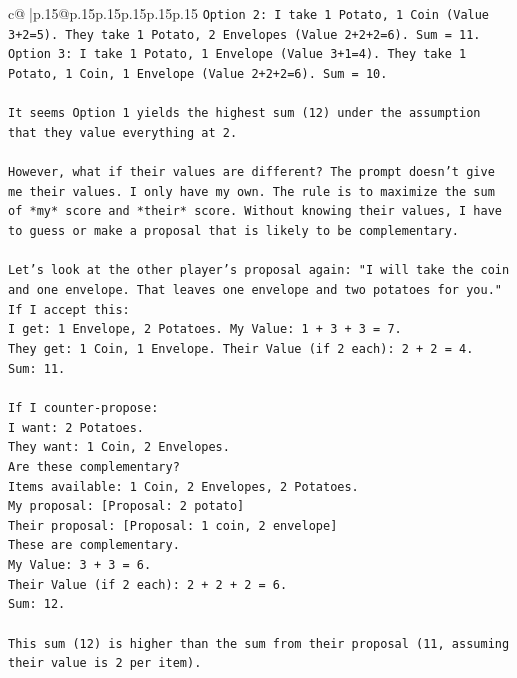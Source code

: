\documentclass{article}
\begin{document}
{\begin{supertabular}{c@{$\;$}|p{.15\linewidth}@{}p{.15\linewidth}p{.15\linewidth}p{.15\linewidth}p{.15\linewidth}p{.15\linewidth}}
{{{\texttt{Option 2: I take 1 Potato, 1 Coin (Value 3+2=5). They take 1 Potato, 2 Envelopes (Value 2+2+2=6). Sum = 11.} \\
\texttt{Option 3: I take 1 Potato, 1 Envelope (Value 3+1=4). They take 1 Potato, 1 Coin, 1 Envelope (Value 2+2+2=6). Sum = 10.} \\
\\ 
\texttt{It seems Option 1 yields the highest sum (12) under the assumption that they value everything at 2.} \\
\\ 
\texttt{However, what if their values are different? The prompt doesn't give me their values. I only have my own. The rule is to maximize the sum of *my* score and *their* score. Without knowing their values, I have to guess or make a proposal that is likely to be complementary.} \\
\\ 
\texttt{Let's look at the other player's proposal again: "I will take the coin and one envelope. That leaves one envelope and two potatoes for you."} \\
\texttt{If I accept this:} \\
\texttt{I get: 1 Envelope, 2 Potatoes. My Value: 1 + 3 + 3 = 7.} \\
\texttt{They get: 1 Coin, 1 Envelope. Their Value (if 2 each): 2 + 2 = 4.} \\
\texttt{Sum: 11.} \\
\\ 
\texttt{If I counter{-}propose:} \\
\texttt{I want: 2 Potatoes.} \\
\texttt{They want: 1 Coin, 2 Envelopes.} \\
\texttt{Are these complementary?} \\
\texttt{Items available: 1 Coin, 2 Envelopes, 2 Potatoes.} \\
\texttt{My proposal: {[}Proposal: 2 potato{]}} \\
\texttt{Their proposal: {[}Proposal: 1 coin, 2 envelope{]}} \\
\texttt{These are complementary.} \\
\texttt{My Value: 3 + 3 = 6.} \\
\texttt{Their Value (if 2 each): 2 + 2 + 2 = 6.} \\
\texttt{Sum: 12.} \\
\\ 
\texttt{This sum (12) is higher than the sum from their proposal (11, assuming their value is 2 per item).} \\
}}}
\end{supertabular}}
\end{document}
